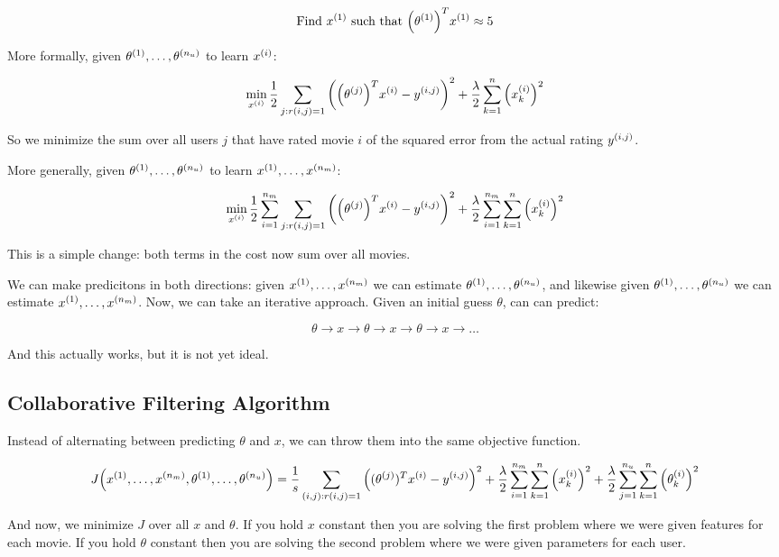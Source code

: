 \[
    \text{Find } x_{}^{(1)} \text{ such that } \qty(\theta_{}^{(1)})^T x_{}^{(1)} \approx 5
\]

More formally, given $\theta_{}^{(1)}, \dots, \theta_{}^{(n_u)}$ to learn $x_{}^{(i)}$:

\[
    \min_{x_{}^{(i)}}
    \frac{1}{2} \sum_{ j:r(i,j)=1 } \qty(
        \qty(\theta_{}^{(j)})^T x_{}^{(i)} - y_{}^{(i,j)}
    )^2 +
    \frac{\lambda}{2} \sum_{k=1}^n \qty( x_{k}^{(i)} )^2
\]

So we minimize the sum over all users $j$ that have rated movie $i$
of the squared error from the actual rating $y_{}^{(i,j)}$.

More generally, given $\theta_{}^{(1)}, \dots, \theta_{}^{(n_u)}$ to learn $x_{}^{(1)}, \dots, x_{}^{(n_m)}$:

\[
    \min_{x_{}^{(i)}}
    \frac{1}{2} \sum_{i=1}^{n_m} \sum_{ j:r(i,j)=1 } \qty(
        \qty(\theta_{}^{(j)})^T x_{}^{(i)} - y_{}^{(i,j)}
    )^2 +
    \frac{\lambda}{2} \sum_{i=1}^{n_m} \sum_{k=1}^n \qty( x_{k}^{(i)} )^2
\]

This is a simple change: both terms in the cost now sum over all movies.

We can make predicitons in both directions:
given $x_{}^{(1)}, \dots, x_{}^{(n_m)}$ we can estimate $\theta_{}^{(1)}, \dots, \theta_{}^{(n_u)}$,
and likewise given $\theta_{}^{(1)}, \dots, \theta_{}^{(n_u)}$ we can estimate $x_{}^{(1)}, \dots, x_{}^{(n_m)}$.
Now, we can take an iterative approach.  Given an initial guess $\theta$, can can predict:

\[ \theta \to x \to \theta \to x \to \theta \to x \to \dots \]

And this actually works, but it is not yet ideal.

\subsection{Collaborative Filtering Algorithm}

Instead of alternating between predicting $\theta$ and $x$, we can throw them into the same objective function.

\[
    J\qty( x_{}^{(1)}, \dots, x_{}^{(n_m)}, \theta_{}^{(1)}, \dots, \theta_{}^{(n_u)} ) = 
    \frac{1}{s} \sum_{(i,j) : r(i,j) = 1} \qty(
        (\theta_{}^{(j)})^T x_{}^{(i)} - y_{}^{(i,j)}
    )^2 +
    \frac{\lambda}{2} \sum_{i=1}^{n_m} \sum_{k=1}^n \qty( x_{k}^{(i)} )^2 + 
    \frac{\lambda}{2} \sum_{j=1}^{n_u} \sum_{k=1}^n \qty( \theta_{k}^{(i)} )^2
\]

And now, we minimize $J$ over all $x$ and $\theta$.
If you hold $x$ constant then you are solving the first problem where we were given features for each movie.
If you hold $\theta$ constant then you are solving the second problem where we were given parameters for each user.

